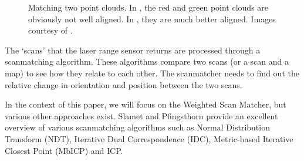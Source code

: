 \begin{figure}[ht]
\centering
{}
\caption{Matching two point clouds. In , the red and green point clouds are obviously not well aligned. In , they are much better aligned. Images courtesy of \cite{slametpfingsthornthesis}.}
\label{fig:screenshots}
\end{figure} 

The `scans' that the laser range sensor returns are processed through a scanmatching algorithm. These algorithms compare two scans (or a scan and a map) to see how they relate to each other. The scanmatcher needs to find out the relative change in orientation and position between the two scans.

In the context of this paper, we will focus on the Weighted Scan Matcher, but various other approaches exist. Slamet and Pfingsthorn \cite{ethembabaoglu2007active} provide an excellent overview of various scanmatching algorithms such as Normal Distribution Transform (NDT), Iterative Dual Correspondence (IDC), Metric-based Iterative Closest Point (MbICP) and ICP.

